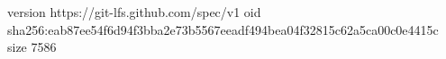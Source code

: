 version https://git-lfs.github.com/spec/v1
oid sha256:eab87ee54f6d94f3bba2e73b5567eeadf494bea04f32815c62a5ca00c0e4415c
size 7586
